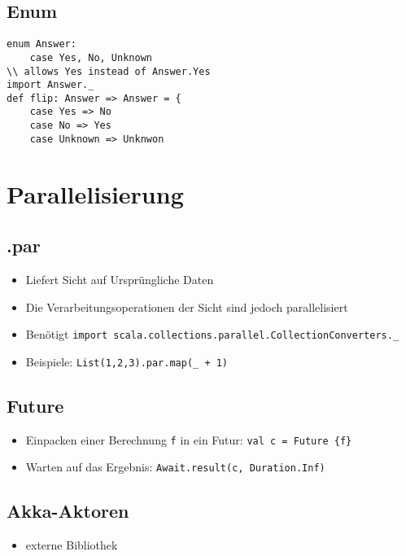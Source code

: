 \subsection{Enum}
\begin{verbatim}
enum Answer:
	case Yes, No, Unknown
\\ allows Yes instead of Answer.Yes
import Answer._ 
def flip: Answer => Answer = {
    case Yes => No
    case No => Yes
    case Unknown => Unknwon
\end{verbatim}
\section{Parallelisierung}
\subsection{.par}
\begin{itemize}
	\item Liefert Sicht auf Ursprüngliche Daten
	\item Die Verarbeitungsoperationen der Sicht sind jedoch parallelisiert
	\item Benötigt \verb|import scala.collections.parallel.CollectionConverters._|
	\item Beispiele: \verb|List(1,2,3).par.map(_ + 1)|
\end{itemize}
\subsection{Future}
\begin{itemize}
	\item Einpacken einer Berechnung \verb|f| in ein Futur: \verb|val c = Future {f}|
	\item Warten auf das Ergebnis: \verb|Await.result(c, Duration.Inf)|
\end{itemize}
\subsection{Akka-Aktoren}
\begin{itemize}
	\item externe Bibliothek
\end{itemize}
